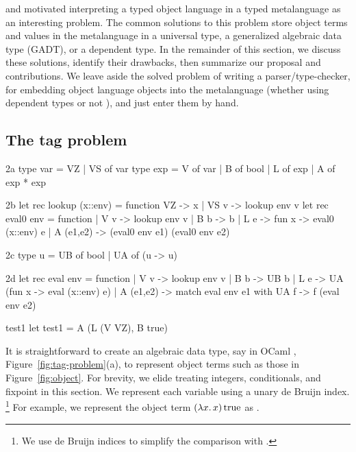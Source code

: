 and \citet{xi-guarded} motivated interpreting
a typed object language in a typed metalanguage as an interesting
problem.  The common solutions to this problem store object terms and
values in the metalanguage in a universal type, a generalized algebraic
data type (GADT), or a dependent type.  In the remainder of this section,
we discuss these solutions, identify their drawbacks, then summarize our
proposal and contributions.  
\ifshort
We leave aside the solved problem of writing a parser\slash type\hyp checker,
for embedding object language objects into the metalanguage
(whether using dependent types \citep{WalidICFP02} or not \citep{baars-typing}),
and just enter them by hand.
\fi

\subsection{The tag problem}\label{tagproblem}

\begin{SaveVerbatim}{2a}
type var = VZ | VS of var
type exp = V of var | B of bool | L of exp | A of exp * exp
\end{SaveVerbatim}
\begin{SaveVerbatim}[commandchars=\@\{\}]{2b}
let rec lookup (x::env) = function VZ -> x | VS v -> lookup env v
let rec eval0 env = function
| V v       -> lookup env v
| B b       -> b 
| L e       -> fun x -> eval0 (x::env) e
| A (e1,e2) -> (eval0 env e1) (eval0 env e2) 
\end{SaveVerbatim}
\begin{SaveVerbatim}{2c}
type u = UB of bool | UA of (u -> u)
\end{SaveVerbatim}
\begin{SaveVerbatim}{2d}
let rec eval env = function
| V v       -> lookup env v
| B b       -> UB b
| L e       -> UA (fun x -> eval (x::env) e)
| A (e1,e2) -> match eval env e1 with UA f -> f (eval env e2)
\end{SaveVerbatim}
\begin{SaveVerbatim}{test1}
let test1 = A (L (V VZ), B true)
\end{SaveVerbatim}

It is straightforward to create an algebraic data type, say in OCaml%
\ifshort, Figure~\ref{fig:tag-problem}(a)\fi, to
represent object terms such as those in Figure~\ref{fig:object}.
For brevity, we elide treating integers, conditionals, and fixpoint in
this section.
\ifshort\else{}\fi
We represent each variable using a unary de Bruijn index.%
\footnote{We use de Bruijn indices to simplify the comparison with
\citet{WalidICFP02}.}
For example, we represent the object term $(\mathopen{\lambda\mathord{x}.\,}x)\mathinner{\mathrm{true}}$ as
\ifshort {}.\else {}\fi
\ifshort

